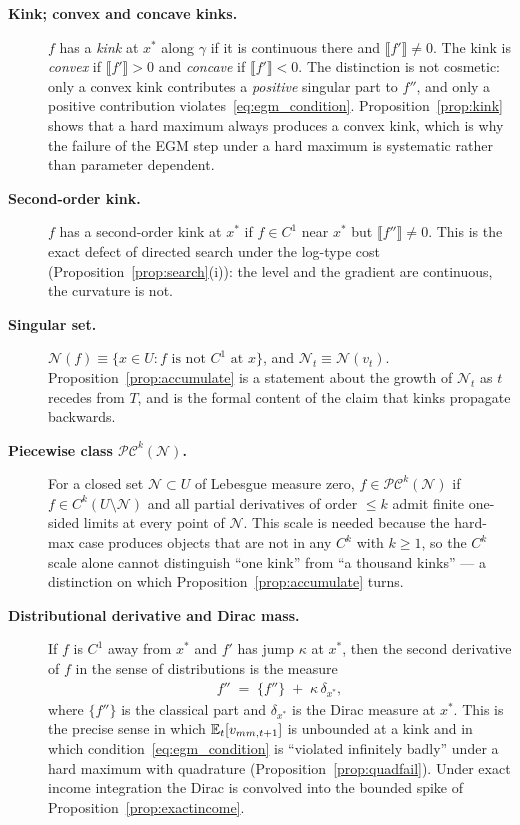 \begin{description}
\item[\textnormal{\textbf{Kink; convex and concave kinks.}}]
$f$ has a \emph{kink} at $x^{\ast}$ along $\gamma$ if it is continuous there and
$\llbracket f'\rrbracket\neq0$. The kink is \emph{convex} if
$\llbracket f'\rrbracket>0$ and \emph{concave} if $\llbracket f'\rrbracket<0$. The
distinction is not cosmetic: only a convex kink contributes a \emph{positive} singular
part to $f''$, and only a positive contribution
violates~\eqref{eq:egm_condition}. Proposition~\ref{prop:kink} shows that a hard
maximum always produces a convex kink, which is why the failure of the EGM step under a
hard maximum is systematic rather than parameter dependent.

\item[\textnormal{\textbf{Second-order kink.}}]
$f$ has a second-order kink at $x^{\ast}$ if $f\in C^{1}$ near $x^{\ast}$ but
$\llbracket f''\rrbracket\neq0$. This is the exact defect of directed search under the
log-type cost (Proposition~\ref{prop:search}(i)): the level and the gradient are
continuous, the curvature is not.

\item[\textnormal{\textbf{Singular set.}}]
$\mathcal{N}(f)\equiv\{x\in U: f\text{ is not }C^{1}\text{ at }x\}$, and
$\mathcal{N}_t\equiv\mathcal{N}(v_t)$. Proposition~\ref{prop:accumulate} is a statement
about the growth of $\mathcal{N}_t$ as $t$ recedes from $T$, and is the formal content
of the claim that kinks propagate backwards.

\item[\textnormal{\textbf{Piecewise class $\mathcal{PC}^{k}(\mathcal{N})$.}}]
For a closed set $\mathcal{N}\subset U$ of Lebesgue measure zero,
$f\in\mathcal{PC}^{k}(\mathcal{N})$ if $f\in C^{k}(U\setminus\mathcal{N})$ and all
partial derivatives of order $\le k$ admit finite one-sided limits at every point of
$\mathcal{N}$. This scale is needed because the hard-max case produces objects that are
not in any $C^{k}$ with $k\ge1$, so the $C^{k}$ scale alone cannot distinguish
``one kink'' from ``a thousand kinks'' --- a distinction on which
Proposition~\ref{prop:accumulate} turns.

\item[\textnormal{\textbf{Distributional derivative and Dirac mass.}}]
If $f$ is $C^{1}$ away from $x^{\ast}$ and $f'$ has jump $\kappa$ at $x^{\ast}$, then the
second derivative of $f$ in the sense of distributions is the measure
\begin{align}
f'' \;=\; \{f''\} \;+\; \kappa\,\delta_{x^{\ast}},
\end{align}
where $\{f''\}$ is the classical part and $\delta_{x^{\ast}}$ is the Dirac measure at
$x^{\ast}$. This is the precise sense in which $\mathbb{E}_t[v_{mm,t+1}]$ is unbounded at a kink
and in which condition~\eqref{eq:egm_condition} is ``violated infinitely badly'' under a
hard maximum with quadrature (Proposition~\ref{prop:quadfail}). Under exact income
integration the Dirac is convolved into the bounded spike of
Proposition~\ref{prop:exactincome}.

\end{description}

